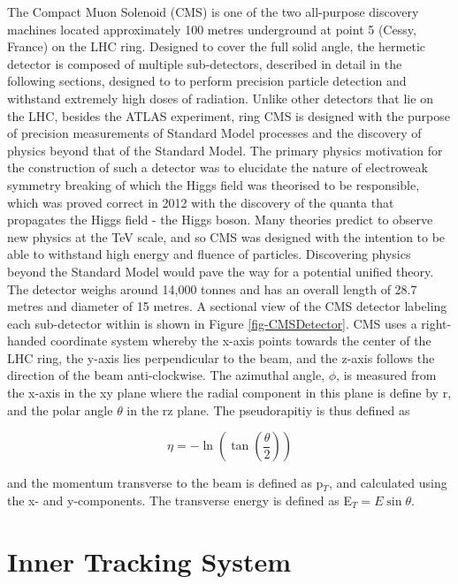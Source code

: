The Compact Muon Solenoid (CMS) \cite{CMSexperiment} is one of the two all-purpose discovery machines located approximately 100 metres underground at point 5 (Cessy, France) on the LHC ring. Designed to cover the full solid angle, the hermetic detector is composed of multiple sub-detectors, described in detail in the following sections, designed to to perform precision particle detection and withstand extremely high doses of radiation. Unlike other detectors that lie on the LHC, besides the ATLAS experiment, ring CMS is designed with the purpose of precision measurements of Standard Model processes and the discovery of physics beyond that of the Standard Model. The primary physics motivation for the construction of such a detector was to elucidate the nature of electroweak symmetry breaking of which the Higgs field was theorised to be responsible, which was proved correct in 2012 with the discovery of the quanta that propagates the Higgs field - the Higgs boson. Many theories predict to observe new physics at the TeV scale, and so CMS was designed with the intention to be able to withstand high energy and fluence of particles. Discovering physics beyond the Standard Model would pave the way for a potential unified theory. The detector weighs around 14,000 tonnes and has an overall length of 28.7 metres and diameter of 15 metres. A sectional view of the CMS detector labeling each sub-detector within is shown in Figure \ref{fig-CMSDetector}. CMS uses a right-handed coordinate system whereby the x-axis points towards the center of the LHC ring, the y-axis lies perpendicular to the beam, and the z-axis follows the direction of the beam anti-clockwise. The azimuthal angle, $\phi$, is measured from the x-axis in the xy plane where the radial component in this plane is define by r, and the polar angle $\theta$ in the rz plane. The pseudorapitiy is thus defined as 

\begin{equation}
\eta = -\ln \left(\tan\left(\frac{\theta}{2}\right)\right)
\end{equation}

and the momentum transverse to the beam is defined as p$_T$, and calculated using the x- and y-components. The transverse energy is defined as E$_T = E\sin\theta$. 

\section{Inner Tracking System} \label{sec-InnerTrackingSystem}

